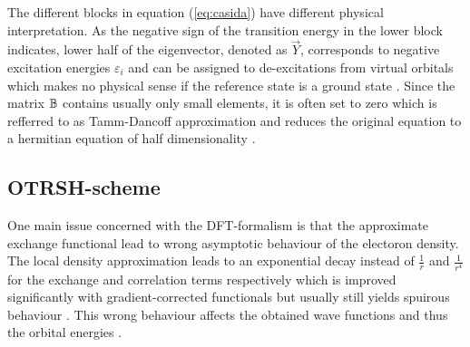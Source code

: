 The different blocks in equation (\ref{eq:casida}) have different physical interpretation.
As the negative sign of the transition energy in the lower block indicates, lower half of the eigenvector, denoted as $\vec{Y}$, corresponds to negative excitation energies $\varepsilon_i$ and can be assigned to de-excitations from virtual orbitals which makes no physical sense if the reference state is a ground state \cite{dreuw}.
Since the matrix $\mathbb{B}$ contains usually only small elements, it is often set to zero which is refferred to as Tamm-Dancoff approximation and reduces the original equation to a hermitian equation of half dimensionality \cite{casida}.

\subsection{OTRSH-scheme}
\label{ch:otrsh}
One main issue concerned with the DFT-formalism is that the approximate exchange functional lead to wrong asymptotic behaviour of the electoron density.
The local density approximation leads to an exponential decay instead of $\frac 1r$ and $\frac{1}{r^4}$ for the exchange and correlation terms respectively \cite{Bokareva} which is improved significantly with gradient-corrected functionals but usually still yields spuirous behaviour \cite{baerRSH}.
This wrong behaviour affects the obtained wave functions and thus the orbital energies \cite{OT-RSH}.

